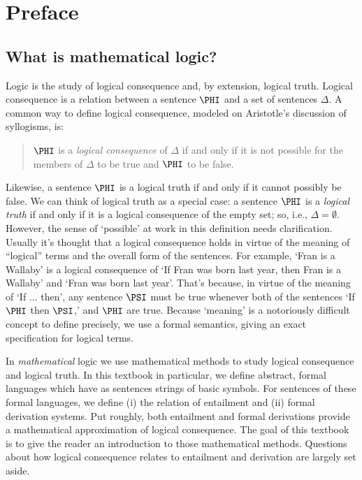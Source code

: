 \documentclass[11pt,fleqn,twoside,openright]{report}%
\newcommand{\df}[1]{\textit{#1}\index{#1|textbf}}
\newcommand{\mention}[1]{`#1'}
\newcommand{\niidf}[1]{\textit{#1}}
\newcommand{\sq}[1]{{``}#1{''}}
\let\origdoublepage\cleardoublepage
\newcommand{\clearemptydoublepage}{%
  \clearpage
  {\pagestyle{empty}\origdoublepage}%
}
\let\cleardoublepage\clearemptydoublepage
\begin{document}
\newpage%
\clearemptydoublepage
\pagestyle{plain}
\tableofcontents

\newpage%
\clearemptydoublepage
\pagestyle{plain}

\chapter*{Preface}

\section*{What is mathematical logic?}

Logic is the study of logical consequence and, by extension, logical truth.
Logical consequence is a relation between a sentence $\PHI$ and a set of sentences $\Delta$. 
A common way to define logical consequence, modeled on Aristotle's discussion of syllogisms, is:
\begin{quote}
$\PHI$ is a \df{logical consequence} of $\Delta$ if and only if it is not possible for the members of $\Delta$ to be true and $\PHI$ to be false.
\end{quote}
Likewise, a sentence $\PHI$ is a logical truth if and only if it cannot possibly be false.
We can think of logical truth as a special case: a sentence $\PHI$ is a \niidf{logical truth} if and only if it is a logical consequence of the empty set; so, i.e., $\Delta=\emptyset$.
However, the sense of \mention{possible} at work in this definition needs clarification.  Usually it's thought that a logical consequence holds in virtue of the meaning of \sq{logical} terms and the overall form of the sentences. 
For example, \mention{Fran is a Wallaby} is a logical consequence of \mention{If Fran was born last year, then Fran is a Wallaby} and \mention{Fran was born last year}.  That's because, in virtue of the meaning of \mention{If $\ldots$ then}, any sentence $\PSI$ must be true whenever both of the sentences \mention{If $\PHI$ then $\PSI$,} and $\PHI$ are true.  Because \mention{meaning} is a notoriously difficult concept to define precisely, we use a formal semantics, giving an exact specification for logical terms. 

In \emph{mathematical} logic we use mathematical methods to study logical consequence and logical truth. 
In this textbook in particular, we define abstract, formal languages which have as sentences strings of basic symbols.
For sentences of these formal languages, we define (i) the relation of entailment and (ii) formal derivation systems. 
Put roughly, both entailment and formal derivations provide a mathematical approximation of logical consequence.
The goal of this textbook is to give the reader an introduction to those mathematical methods.  
Questions about how logical consequence relates to entailment and derivation are largely set aside. 
\end{document}
